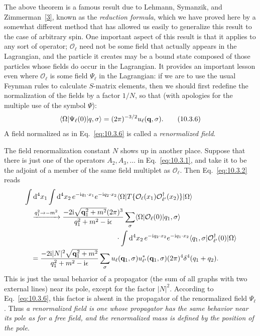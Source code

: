 The above theorem is a famous result due to Lehmann, Symanzik, and
Zimmerman~\hyperref[ref:10.3]{[3]}, known as the \emph{reduction formula},
which we have proved here by a somewhat different method that has allowed us
easily to generalize this result to the case of arbitrary spin. One important
aspect of this result is that it applies to any sort of operator;
$\mathcal O_\ell$ need not be some field that actually appears in the
Lagrangian, and the particle it creates may be a bound state composed of those
particles whose fields do occur in the Lagrangian. It provides an important
lesson even where $\mathcal O_\ell$ is some field $\Psi_\ell$ in the
Lagrangian: if we are to use the usual Feynman rules to calculate $S$-matrix
elements, then we should first redefine the normalization of the fields by a
factor $1/N$, so that (with apologies for the multiple use of the symbol
$\Psi$):
\begin{equation}
\langle \Omega\rvert\Psi_\ell(0)\lvert q,\sigma\rangle
=(2\pi)^{-3/2}u_\ell(\mathbf q,\sigma).
\tag{10.3.6}\label{eq:10.3.6}
\end{equation}
A field normalized as in Eq.~\eqref{eq:10.3.6} is called a
\emph{renormalized field}.

The field renormalization constant $N$ shows up in another place. Suppose that
there is just one of the operators $A_2,A_3,\ldots$ in Eq.~\eqref{eq:10.3.1},
and take it to be the adjoint of a member of the same field multiplet as
$\mathcal O_\ell$. Then Eq.~\eqref{eq:10.3.2} reads
\begin{align*}
&\int \dd^4x_1\int \dd^4x_2\,e^{-\ii q_1\cdot x_1}e^{-\ii q_2\cdot x_2}
\bra{\Omega}T\{\mathcal O_\ell(x_1)\mathcal O_{\ell'}^\dagger(x_2)\}
\ket{\Omega}
\\
&\quad\xrightarrow{q_1^2\to-m^2}
\frac{-2\ii\sqrt{\mathbf q_1^2+m^2}(2\pi)^3}
{q_1^2+m^2-\ii\epsilon}
\sum_\sigma\bra{\Omega}\mathcal O_\ell(0)\ket{q_1,\sigma}
\\
&\hspace{46mm}\cdot\int \dd^4x_2\,e^{-\ii q_2\cdot x_2}e^{-\ii q_1\cdot x_2}
\bra{q_1,\sigma}\mathcal O_{\ell'}^\dagger(0)\ket{\Omega}
\\
&\quad=
\frac{-2\ii|N|^2\sqrt{\mathbf q_1^2+m^2}}
{q_1^2+m^2-\ii\epsilon}
\sum_\sigma u_\ell(\mathbf q_1,\sigma)u_{\ell'}^*(\mathbf q_1,\sigma)
(2\pi)^4\delta^4(q_1+q_2).
\end{align*}
This is just the usual behavior of a propagator (the sum of all graphs with two
external lines) near its pole, except for the factor $|N|^2$. According to
Eq.~\eqref{eq:10.3.6}, this factor is absent in the propagator of the
renormalized field $\Psi_\ell$. Thus \emph{a renormalized field is one whose
propagator has the same behavior near its pole as for a free field, and the
renormalized mass is defined by the position of the pole}.

